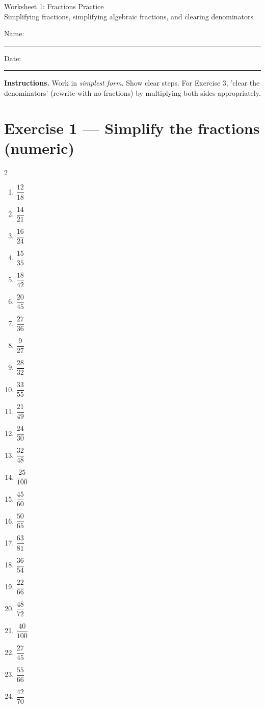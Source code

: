 \documentclass[12pt]{article}
\begin{document}
\begin{center}
{\LARGE Worksheet 1: Fractions Practice}\\
{\large Simplifying fractions, simplifying algebraic fractions, and clearing denominators}
\end{center}
\vspace{0.5em}
Name: \rule{0.6\textwidth}{0.4pt} \hfill Date: \rule{0.2\textwidth}{0.4pt}

\vspace{0.8em}
\textbf{Instructions.} Work in \emph{simplest form}. Show clear steps. For Exercise 3, 'clear the denominators' (rewrite with no fractions) by multiplying both sides appropriately.

\section*{Exercise 1 — Simplify the fractions (numeric)}
\begin{multicols}{2}
\begin{enumerate}
\item $\dfrac{12}{18}$
\item $\dfrac{14}{21}$
\item $\dfrac{16}{24}$
\item $\dfrac{15}{35}$
\item $\dfrac{18}{42}$
\item $\dfrac{20}{45}$
\item $\dfrac{27}{36}$
\item $\dfrac{9}{27}$
\item $\dfrac{28}{32}$
\item $\dfrac{33}{55}$
\item $\dfrac{21}{49}$
\item $\dfrac{24}{30}$
\item $\dfrac{32}{48}$
\item $\dfrac{25}{100}$
\item $\dfrac{45}{60}$
\item $\dfrac{50}{65}$
\item $\dfrac{63}{81}$
\item $\dfrac{36}{54}$
\item $\dfrac{22}{66}$
\item $\dfrac{48}{72}$
\item $\dfrac{40}{100}$
\item $\dfrac{27}{45}$
\item $\dfrac{55}{66}$
\item $\dfrac{42}{70}$
\end{enumerate}
\end{multicols}
\end{document}
